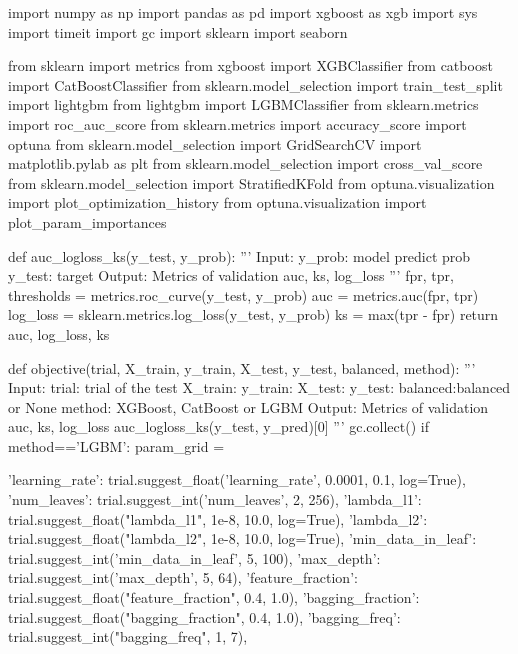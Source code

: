\begin{codigo}[caption={Código implementado para o Tuning com o Optuna.}, label={codigo:im:tuning}, language=Python, breaklines=true]
import numpy as np
import pandas as pd
import xgboost as xgb
import sys
import timeit
import gc
import sklearn
import seaborn

from sklearn import metrics
from xgboost import XGBClassifier
from catboost import CatBoostClassifier
from sklearn.model_selection import train_test_split
import lightgbm
from lightgbm import LGBMClassifier
from sklearn.metrics import roc_auc_score
from sklearn.metrics import accuracy_score
import optuna
from sklearn.model_selection import GridSearchCV
import matplotlib.pylab as plt
from sklearn.model_selection import cross_val_score
from sklearn.model_selection import StratifiedKFold
from optuna.visualization import plot_optimization_history
from optuna.visualization import plot_param_importances

def auc_logloss_ks(y_test, y_prob):
    '''
    Input:
        y_prob: model predict prob
        y_test: target
    Output: Metrics of validation
        auc, ks, log_loss
    '''
    fpr, tpr, thresholds = metrics.roc_curve(y_test, y_prob)
    auc = metrics.auc(fpr, tpr)
    log_loss = sklearn.metrics.log_loss(y_test, y_prob)
    ks = max(tpr - fpr)
    return auc, log_loss, ks

def objective(trial, X_train, y_train, X_test, y_test, balanced, method):
    '''
    Input:
        trial: trial of the test
        X_train:
        y_train:
        X_test:
        y_test:
        balanced:balanced or None
        method: XGBoost, CatBoost or LGBM
    Output: Metrics of validation
        auc, ks, log_loss
        auc_logloss_ks(y_test, y_pred)[0]
    '''
    gc.collect()
    if method=='LGBM':
        param_grid = {'learning_rate': trial.suggest_float('learning_rate', 0.0001, 0.1, log=True),
                      'num_leaves': trial.suggest_int('num_leaves', 2, 256),
                      'lambda_l1': trial.suggest_float("lambda_l1", 1e-8, 10.0, log=True),
                      'lambda_l2': trial.suggest_float("lambda_l2", 1e-8, 10.0, log=True),
                      'min_data_in_leaf': trial.suggest_int('min_data_in_leaf', 5, 100),
                      'max_depth': trial.suggest_int('max_depth', 5, 64),
                      'feature_fraction': trial.suggest_float("feature_fraction", 0.4, 1.0),
                      'bagging_fraction': trial.suggest_float("bagging_fraction", 0.4, 1.0),
                      'bagging_freq': trial.suggest_int("bagging_freq", 1, 7),
  
}
\end{codigo}
